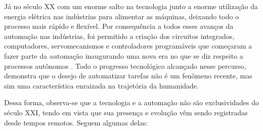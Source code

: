         Já no século XX com um enorme salto na tecnologia junto a enorme utilização da energia elétrica nas indústrias para alimentar as máquinas, deixando todo o processo mais rápido e flexível. Por consequência a todos esses avanços da automação nas indústrias, foi permitido a criação dos circuitos integrados, computadores, servomecanismos e controladores programáveis que começaram a fazer parte da automação inaugurando uma nova era no que se diz respeito a processos autônomos \cite{maisSobreXX}. Todo o progresso tecnológico alcançado nesse percurso, demonstra que o desejo de automatizar tarefas não é um fenômeno recente, mas sim uma característica enraizada na trajetória da humanidade\cite{historiaAutomacao}. 
        
        Dessa forma, observa-se que a tecnologia e a automação não são exclusividades do século XXI, tendo em vista que sua presença e evolução vêm sendo registradas desde tempos remotos. Seguem algumas delas:
        
